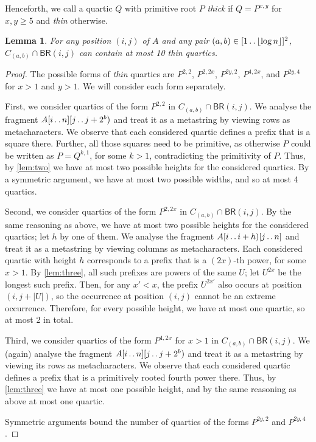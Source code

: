 \documentclass[11pt,letterpaper]{article}
\newcommand{\floor}[1]{\left\lfloor #1 \right\rfloor}
\newcommand{\can}[2]{C_{(#1,#2)}}
\newcommand{\BR}{\textsf{BR}}
\def\dd{\mathinner{.\,.}}
\newtheorem{lemma}[theorem]{Lemma}
\begin{document}
Henceforth, we call a quartic $Q$ with primitive root $P$ \emph{thick} if $Q = P^{x,y}$ for $x,y \geq 5$ and \emph{thin} otherwise.

\begin{lemma}\label{lem:thick_period}
For any position $(i,j)$ of $A$ and any pair $(a,b) \in [1 \dd \floor{\log n}]^2$, $\can{a}{b} \cap \BR(i,j)$ can contain at most 10 thin quartics.
\end{lemma}
\begin{proof}
The possible forms of \emph{thin} quartics are
$P^{2,2}$,
$P^{2,2x}$,
$P^{2y,2}$,
$P^{4,2x}$, and
$P^{2y,4}$ for $x > 1$ and $y > 1$.
We will consider each form separately.

First, we consider quartics of the form $P^{2,2}$ in $\can{a}{b} \cap \BR(i,j)$. We analyse the fragment $A[i \dd n][j \dd j+2^{b})$
and treat it as a metastring by viewing rows as metacharacters.
We observe that each considered quartic defines a prefix that is a square there. Further, all those squares need to be
primitive, as otherwise $P$ could be written as $P=Q^{k,1}$, for some $k>1$, contradicting the primitivity of $P$.
Thus, by \cref{lem:two} we have at most two possible heights for the considered quartics. By a symmetric argument,
we have at most two possible widths, and so at most 4 quartics.

Second, we consider quartics of the form $P^{2,2x}$ in $\can{a}{b} \cap \BR(i,j)$. By the same reasoning as above,
we have at most two possible heights for the considered quartics; let $h$ by one of them.
We analyse the fragment $A[i \dd i+h)[j \dd n]$ and treat it as a metastring by viewing columns as metacharacters.
Each considered quartic with height $h$ corresponds to a prefix
that is a $(2x)$-th power, for some $x>1$. By \cref{lem:three}, all such prefixes are powers
of the same $U$; let $U^{2x}$ be the longest such prefix. Then, for any $x'<x$, the prefix $U^{2x'}$
also occurs at position $(i,j+|U|)$, so the occurrence at position $(i,j)$ cannot be an extreme occurrence. Therefore, for every possible height,
we have at most one quartic, so at most 2 in total.

Third, we consider quartics of the form $P^{4,2x}$ for $x>1$ in $\can{a}{b} \cap \BR(i,j)$. We (again)
analyse the fragment $A[i \dd n][j \dd j+2^{b})$ and treat it as a metastring by viewing its rows as metacharacters.
We observe that each considered quartic defines a prefix that is a primitively rooted fourth power there. 
Thus, by \cref{lem:three} we have at most one possible height, and by the same reasoning as above
at most one quartic.

Symmetric arguments bound the number of quartics of the forms $P^{2y,2}$ and $P^{2y,4}$.
\end{proof}
\end{document}
